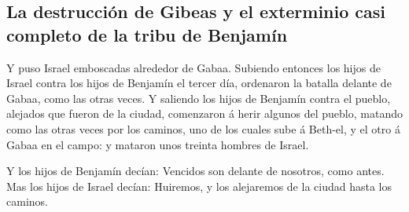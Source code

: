 \hypertarget{la-destrucciuxf3n-de-gibeas-y-el-exterminio-casi-completo-de-la-tribu-de-benjamuxedn}{%
\subsection{La destrucción de Gibeas y el exterminio casi completo de la
tribu de
Benjamín}\label{la-destrucciuxf3n-de-gibeas-y-el-exterminio-casi-completo-de-la-tribu-de-benjamuxedn}}

 Y puso Israel emboscadas alrededor de Gabaa.
 Subiendo entonces los hijos de Israel contra los hijos
de Benjamín el tercer día, ordenaron la batalla delante de Gabaa, como
las otras veces.  Y saliendo los hijos de Benjamín contra
el pueblo, alejados que fueron de la ciudad, comenzaron á herir algunos
del pueblo, matando como las otras veces por los caminos, uno de los
cuales sube á Beth-el, y el otro á Gabaa en el campo: y mataron unos
treinta hombres de Israel.

 Y los hijos de Benjamín decían: Vencidos son delante de
nosotros, como antes. Mas los hijos de Israel decían: Huiremos, y los
alejaremos de la ciudad hasta los caminos.

